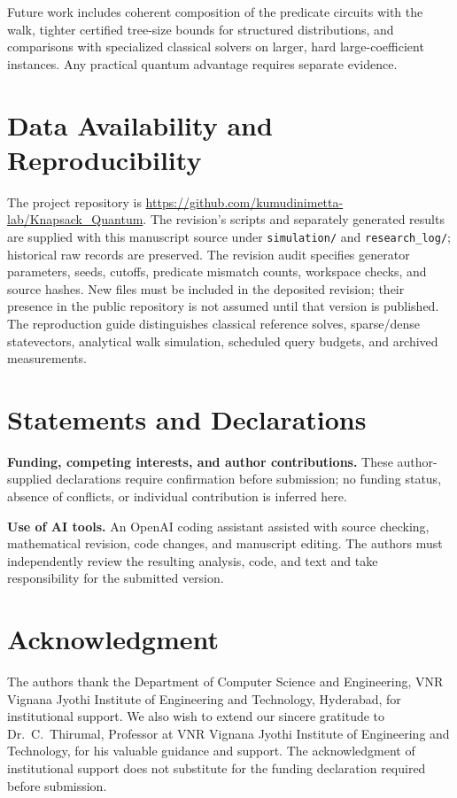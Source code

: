 \documentclass[pdflatex,sn-mathphys-num]{sn-jnl}
\begin{document}
Future work includes coherent composition of the predicate circuits with the walk, tighter certified tree-size bounds for structured distributions, and comparisons with specialized classical solvers on larger, hard large-coefficient instances. Any practical quantum advantage requires separate evidence.


\section{Data Availability and Reproducibility}
The project repository is \url{https://github.com/kumudinimetta-lab/Knapsack_Quantum}. The revision's scripts and separately generated results are supplied with this manuscript source under \texttt{simulation/} and \texttt{research\_log/}; historical raw records are preserved. The revision audit specifies generator parameters, seeds, cutoffs, predicate mismatch counts, workspace checks, and source hashes. New files must be included in the deposited revision; their presence in the public repository is not assumed until that version is published. The reproduction guide distinguishes classical reference solves, sparse/dense statevectors, analytical walk simulation, scheduled query budgets, and archived measurements.

\section*{Statements and Declarations}
\textbf{Funding, competing interests, and author contributions.} These author-supplied declarations require confirmation before submission; no funding status, absence of conflicts, or individual contribution is inferred here.

\textbf{Use of AI tools.} An OpenAI coding assistant assisted with source checking, mathematical revision, code changes, and manuscript editing. The authors must independently review the resulting analysis, code, and text and take responsibility for the submitted version.

\section*{Acknowledgment}

The authors thank the Department of Computer Science and Engineering, VNR Vignana Jyothi Institute of Engineering and Technology, Hyderabad, for institutional support. We also wish to extend our sincere gratitude to Dr.~C.~Thirumal, Professor at VNR Vignana Jyothi Institute of Engineering and Technology, for his valuable guidance and support. The acknowledgment of institutional support does not substitute for the funding declaration required before submission.

\setlength{\bibsep}{3pt}

\end{document}
